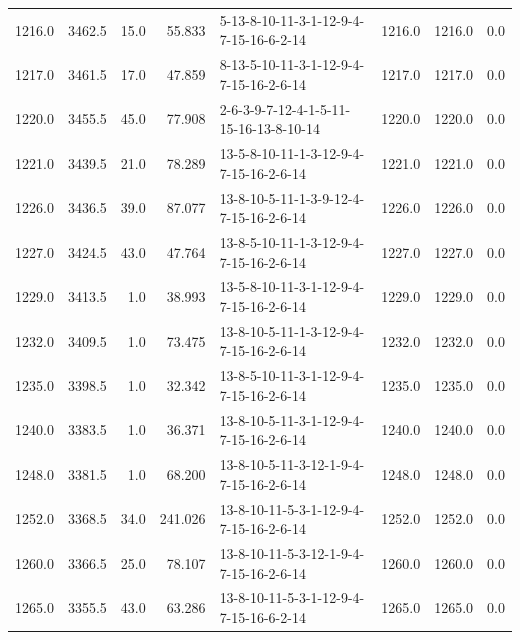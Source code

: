 \begin{tabular}{rrrrlrrr}
 1216.0 &  3462.5 &           15.0 &             55.833 &  5-13-8-10-11-3-1-12-9-4-7-15-16-6-2-14 &        1216.0 &          1216.0 &       0.0 \\
 1217.0 &  3461.5 &           17.0 &             47.859 &  8-13-5-10-11-3-1-12-9-4-7-15-16-2-6-14 &        1217.0 &          1217.0 &       0.0 \\
 1220.0 &  3455.5 &           45.0 &             77.908 &  2-6-3-9-7-12-4-1-5-11-15-16-13-8-10-14 &        1220.0 &          1220.0 &       0.0 \\
 1221.0 &  3439.5 &           21.0 &             78.289 &  13-5-8-10-11-1-3-12-9-4-7-15-16-2-6-14 &        1221.0 &          1221.0 &       0.0 \\
 1226.0 &  3436.5 &           39.0 &             87.077 &  13-8-10-5-11-1-3-9-12-4-7-15-16-2-6-14 &        1226.0 &          1226.0 &       0.0 \\
 1227.0 &  3424.5 &           43.0 &             47.764 &  13-8-5-10-11-1-3-12-9-4-7-15-16-2-6-14 &        1227.0 &          1227.0 &       0.0 \\
 1229.0 &  3413.5 &            1.0 &             38.993 &  13-5-8-10-11-3-1-12-9-4-7-15-16-2-6-14 &        1229.0 &          1229.0 &       0.0 \\
 1232.0 &  3409.5 &            1.0 &             73.475 &  13-8-10-5-11-1-3-12-9-4-7-15-16-2-6-14 &        1232.0 &          1232.0 &       0.0 \\
 1235.0 &  3398.5 &            1.0 &             32.342 &  13-8-5-10-11-3-1-12-9-4-7-15-16-2-6-14 &        1235.0 &          1235.0 &       0.0 \\
 1240.0 &  3383.5 &            1.0 &             36.371 &  13-8-10-5-11-3-1-12-9-4-7-15-16-2-6-14 &        1240.0 &          1240.0 &       0.0 \\
 1248.0 &  3381.5 &            1.0 &             68.200 &  13-8-10-5-11-3-12-1-9-4-7-15-16-2-6-14 &        1248.0 &          1248.0 &       0.0 \\
 1252.0 &  3368.5 &           34.0 &            241.026 &  13-8-10-11-5-3-1-12-9-4-7-15-16-2-6-14 &        1252.0 &          1252.0 &       0.0 \\
 1260.0 &  3366.5 &           25.0 &             78.107 &  13-8-10-11-5-3-12-1-9-4-7-15-16-2-6-14 &        1260.0 &          1260.0 &       0.0 \\
 1265.0 &  3355.5 &           43.0 &             63.286 &  13-8-10-11-5-3-1-12-9-4-7-15-16-6-2-14 &        1265.0 &          1265.0 &       0.0 \\

\end{tabular}
